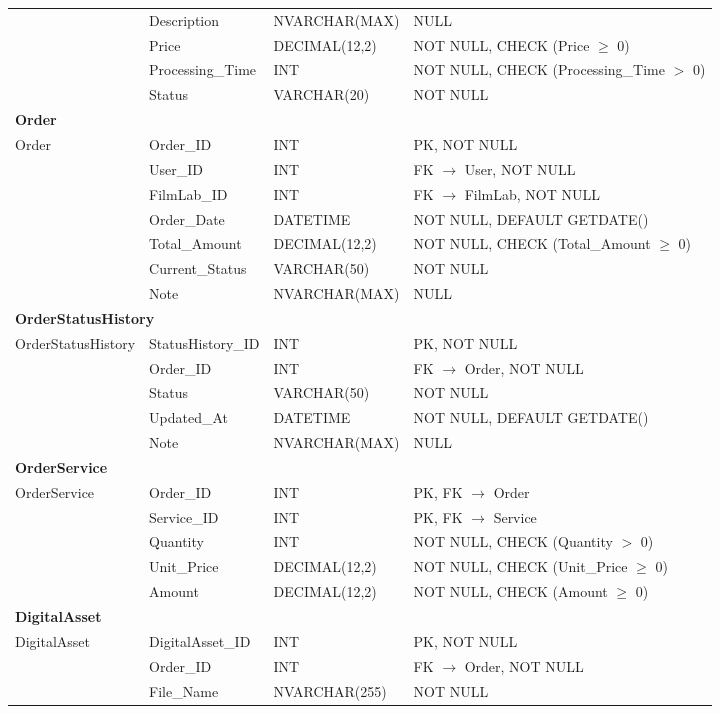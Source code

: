 \documentclass[12pt,a4paper]{article}
\begin{document}
\begin{longtable}{|l|l|l|p{5.8cm}|}
 & Description & NVARCHAR(MAX) & NULL \\
 & Price & DECIMAL(12,2) & NOT NULL, CHECK (Price $\geq$ 0) \\
 & Processing\_Time & INT & NOT NULL, CHECK (Processing\_Time $>$ 0) \\
 & Status & VARCHAR(20) & NOT NULL \\
\hline
\multicolumn{4}{|l|}{\textbf{Order}} \\
\hline
Order & Order\_ID & INT & PK, NOT NULL \\
 & User\_ID & INT & FK $\to$ User, NOT NULL \\
 & FilmLab\_ID & INT & FK $\to$ FilmLab, NOT NULL \\
 & Order\_Date & DATETIME & NOT NULL, DEFAULT GETDATE() \\
 & Total\_Amount & DECIMAL(12,2) & NOT NULL, CHECK (Total\_Amount $\geq$ 0) \\
 & Current\_Status & VARCHAR(50) & NOT NULL \\
 & Note & NVARCHAR(MAX) & NULL \\
\hline
\multicolumn{4}{|l|}{\textbf{OrderStatusHistory}} \\
\hline
OrderStatusHistory & StatusHistory\_ID & INT & PK, NOT NULL \\
 & Order\_ID & INT & FK $\to$ Order, NOT NULL \\
 & Status & VARCHAR(50) & NOT NULL \\
 & Updated\_At & DATETIME & NOT NULL, DEFAULT GETDATE() \\
 & Note & NVARCHAR(MAX) & NULL \\
\hline
\multicolumn{4}{|l|}{\textbf{OrderService}} \\
\hline
OrderService & Order\_ID & INT & PK, FK $\to$ Order \\
 & Service\_ID & INT & PK, FK $\to$ Service \\
 & Quantity & INT & NOT NULL, CHECK (Quantity $>$ 0) \\
 & Unit\_Price & DECIMAL(12,2) & NOT NULL, CHECK (Unit\_Price $\geq$ 0) \\
 & Amount & DECIMAL(12,2) & NOT NULL, CHECK (Amount $\geq$ 0) \\
\hline
\multicolumn{4}{|l|}{\textbf{DigitalAsset}} \\
\hline
DigitalAsset & DigitalAsset\_ID & INT & PK, NOT NULL \\
 & Order\_ID & INT & FK $\to$ Order, NOT NULL \\
 & File\_Name & NVARCHAR(255) & NOT NULL \\

\end{longtable}
\end{document}
